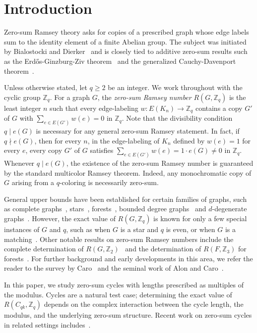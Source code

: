 \documentclass[11pt]{article}
\theoremstyle{remark}
\newcommand{\Z}{\mathbb Z}
\begin{document}
\section{Introduction}

Zero-sum Ramsey theory asks for copies of a prescribed graph whose edge labels sum to the identity element of a finite Abelian group.
The subject was initiated by Bialostocki and Dierker~\cite{BD1990,BD1992} and is closely tied to additive zero-sum results such as the Erd\H{o}s-Ginzburg-Ziv theorem~\cite{EGZ1961} and the generalized Cauchy-Davenport theorem~\cite{Cauchy1813,Davenport1935}.

Unless otherwise stated, let $q\ge2$ be an integer.
We work throughout with the cyclic group $\Z_q$.
For a graph $G$, the \emph{zero-sum Ramsey number} $R(G,\Z_q)$ is the least integer $n$ such that every edge-labeling $w\colon E(K_n)\to \Z_q$ contains a copy $G'$ of $G$ with $\sum_{e\in E(G')} w(e)=0$ in $\Z_q$.
Note that the divisibility condition $q\mid e(G)$ is necessary for any general zero-sum Ramsey statement.
In fact, if $q\nmid e(G)$, then for every $n$, in the edge-labeling of $K_n$ defined by $w(e)=1$ for every $e$, every copy $G'$ of $G$ satisfies $\sum_{e\in E(G')} w(e)=1\cdot e(G)\ne 0$ in $\Z_q$.
Whenever $q\mid e(G)$, the existence of the zero-sum Ramsey number is guaranteed by the standard multicolor Ramsey theorem.
Indeed, any monochromatic copy of $G$ arising from a $q$-coloring is necessarily zero-sum.

General upper bounds have been established for certain families of graphs, such as complete graphs~\cite{AC1993,Caro1992Complete,Ca1994}, stars~\cite{Ca1992}, forests~\cite{CD2026}, bounded degree graphs~\cite{KLMS2025} and $d$-degenerate graphs~\cite{Shapiro2026}.
However, the exact value of \(R(G, \Z_q)\) is known for only a few special instances of $G$ and $q$, such as when \(G\) is a star and \(q\) is even, or when \(G\) is a matching~\cite{BD1992}.
Other notable results on zero-sum Ramsey numbers include the complete determination of $R(G, \Z_2)$~\cite{Caro1994} and the determination of $R(F, \Z_3)$ for forests~\cite{CM2025, ACP2025}.
For further background and early developments in this area, we refer the reader to the survey by Caro~\cite{Caro1996} and the seminal work of Alon and Caro~\cite{AC1993}.

In this paper, we study zero-sum cycles with lengths prescribed as multiples of the modulus.
Cycles are a natural test case; determining the exact value of $R(C_{qk},\Z_q)$ depends on the complex interaction between the cycle length, the modulus, and the underlying zero-sum structure.
Recent work on zero-sum cycles in related settings includes~\cite{CGHS2025,CKMS2025}.
\end{document}
